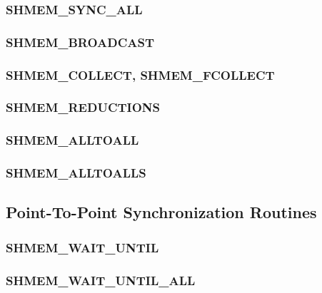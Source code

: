 \documentclass[10pt]{book}
\begin{document}
\subsubsection{\textbf{SHMEM\_SYNC\_ALL}}\label{subsec:shmem_sync_all}


\subsubsection{\textbf{SHMEM\_BROADCAST}}\label{subsec:shmem_broadcast}


\subsubsection{\textbf{SHMEM\_COLLECT, SHMEM\_FCOLLECT}}\label{subsec:shmem_collect}


\subsubsection{\textbf{SHMEM\_REDUCTIONS}}\label{subsec:shmem_reductions}


\subsubsection{\textbf{SHMEM\_ALLTOALL}}\label{subsec:shmem_alltoall}


\subsubsection{\textbf{SHMEM\_ALLTOALLS}}\label{subsec:shmem_alltoalls}





\subsection{Point-To-Point Synchronization Routines}\label{subsec:p2p_intro}


\subsubsection{\textbf{SHMEM\_WAIT\_UNTIL}}\label{subsec:shmem_wait_until}


\subsubsection{\textbf{SHMEM\_WAIT\_UNTIL\_ALL}}\label{subsec:shmem_wait_until_all}

\end{document}
